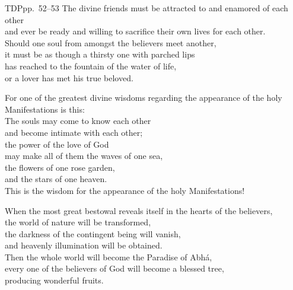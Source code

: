 \documentclass[14pt]{extarticle}
\begin{document}
\newpage

\begin{hafez}{TDP}{pp.~52--53}
  The divine friends must be attracted to and enamored of each other \\
    \mbox{\hspace{0.1in}}and ever be ready and willing to sacrifice their own lives for each other. \\
  Should one soul from amongst the believers meet another, \\
    \mbox{\hspace{0.1in}}it must be as though a thirsty one with parched lips \\
      \mbox{\hspace{0.2in}}has reached to the fountain of the water of life, \\
    \mbox{\hspace{0.1in}}or a lover has met his true beloved.

  For one of the greatest divine wisdoms regarding the appearance of the holy Manifestations is this: \\
    \mbox{\hspace{0.1in}}The souls may come to know each other \\
      \mbox{\hspace{0.2in}}and become intimate with each other; \\
    \mbox{\hspace{0.1in}}the power of the love of God \\
      \mbox{\hspace{0.2in}}may make all of them the waves of one sea, \\
      \mbox{\hspace{0.2in}}the flowers of one rose garden, \\
      \mbox{\hspace{0.2in}}and the stars of one heaven. \\
  This is the wisdom for the appearance of the holy Manifestations!

  When the most great bestowal reveals itself in the hearts of the believers, \\
    \mbox{\hspace{0.1in}}the world of nature will be transformed, \\
    \mbox{\hspace{0.1in}}the darkness of the contingent being will vanish, \\
    \mbox{\hspace{0.1in}}and heavenly illumination will be obtained. \\
  Then the whole world will become the Paradise of Abhá, \\
    \mbox{\hspace{0.1in}}every one of the believers of God will become a blessed tree, \\
    \mbox{\hspace{0.1in}}producing wonderful fruits.
\end{hafez}
\end{document}
